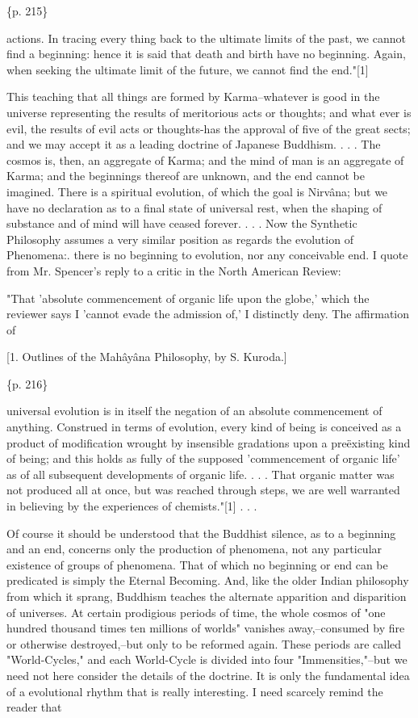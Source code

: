 \{p. 215\}

actions. In tracing every thing back to the ultimate limits of the past, we cannot find a beginning: hence it is said that death and birth have no beginning. Again, when seeking the ultimate limit of the future, we cannot find the end."[1]

This teaching that all things are formed by Karma--whatever is good in the universe representing the results of meritorious acts or thoughts; and what ever is evil, the results of evil acts or thoughts-has the approval of five of the great sects; and we may accept it as a leading doctrine of Japanese Buddhism. . . . The cosmos is, then, an aggregate of Karma; and the mind of man is an aggregate of Karma; and the beginnings thereof are unknown, and the end cannot be imagined. There is a spiritual evolution, of which the goal is Nirvâna; but we have no declaration as to a final state of universal rest, when the shaping of substance and of mind will have ceased forever. . . . Now the Synthetic Philosophy assumes a very similar position as regards the evolution of Phenomena:. there is no beginning to evolution, nor any conceivable end. I quote from Mr. Spencer's reply to a critic in the North American Review:

"That 'absolute commencement of organic life upon the globe,' which the reviewer says I 'cannot evade the admission of,' I distinctly deny. The affirmation of

[1. Outlines of the Mahâyâna Philosophy, by S. Kuroda.]

\{p. 216\}

universal evolution is in itself the negation of an absolute commencement of anything. Construed in terms of evolution, every kind of being is conceived as a product of modification wrought by insensible gradations upon a preëxisting kind of being; and this holds as fully of the supposed 'commencement of organic life' as of all subsequent developments of organic life. . . . That organic matter was not produced all at once, but was reached through steps, we are well warranted in believing by the experiences of chemists."[1] . . .

Of course it should be understood that the Buddhist silence, as to a beginning and an end, concerns only the production of phenomena, not any particular existence of groups of phenomena. That of which no beginning or end can be predicated is simply the Eternal Becoming. And, like the older Indian philosophy from which it sprang, Buddhism teaches the alternate apparition and disparition of universes. At certain prodigious periods of time, the whole cosmos of "one hundred thousand times ten millions of worlds" vanishes away,--consumed by fire or otherwise destroyed,--but only to be reformed again. These periods are called "World-Cycles," and each World-Cycle is divided into four "Immensities,"--but we need not here consider the details of the doctrine. It is only the fundamental idea of a evolutional rhythm that is really interesting. I need scarcely remind the reader that

